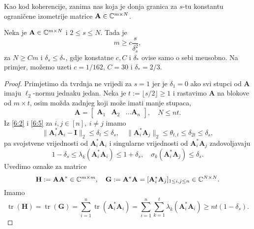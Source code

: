 \documentclass[a4paper,twoside,12pt]{memoir} %
\newcommand{\vect}[1]{\mathbf{#1}}
\renewcommand{\vec}{\vect}
\newcommand{\norm}[1]{\|{#1}\|}
\DeclareMathOperator{\tr}{tr}
\begin{document}
Kao kod koherencije, zanima nas koja je donja granica za $s$-tu konstantu ograni\v{c}ene izometrije matrice $\vec A \in \C^{m \times N}$.

\begin{thm}
    Neka je $\vec A \in \C^{m \times N}$ i $2 \leq s \leq N$. Tada je
    \begin{equation}\label{6:9}
        m \geq c \frac{s}{\delta_s^2} , 
    \end{equation}
    za $N \geq Cm$ i $\delta_s \leq \delta_*$, gdje konstatne $c, C$ i $\delta_*$ ovise samo o sebi me\dj usobno. Na primjer, mo\v{z}emo uzeti $c = 1/162$, $C = 30$ i $\delta_* = 2/3$.
\end{thm}
\begin{proof}
    Primjetimo da tvrdnja ne vrijedi za $s = 1$ jer je $\delta_1 = 0$ ako svi stupci od $\vec A$ imaju $\ell_2$-normu jednaku jedan. Neka je $t := \lfloor s/2 \rfloor \geq 1$ i rastavimo $\vec A$ na blokove od $m \times t$, osim mo\v{z}da zadnjeg koji mo\v{z}e imati manje stupaca,
    \begin{equation*}
        \vec A =
        \begin{bmatrix*}
            \vec A_1 & \vec A_2 & \dots \vec A_n 
        \end{bmatrix*},
        \quad  N \leq nt.
    \end{equation*}
    Iz \eqref{6:2} i \eqref{6:5} za $i,j \in [n],\ i \neq j$ imamo
    \begin{equation*}
        \norm{\vec A^*_i \vec A_i - \vec I}_2 \leq \delta_t \leq \delta_s, \quad \norm{\vec A^*_i \vec A_j}_2 \leq \theta_{t,t} \leq \delta_{2t} \leq \delta_s,
    \end{equation*}
    pa svojstvene vrijednosti od $\vec A^*_i \vec A_i$ i singularne vrijednosti od $\vec A^*_i \vec A_j$ zadovoljavaju
    \begin{equation*}
        1 - \delta_s \leq \lambda_k(\vec A^*_i \vec A_i) \leq 1 + \delta_s, \quad \sigma_k(\vec A^*_i \vec A_j) \leq \delta_s. 
    \end{equation*}
    Uvedimo oznake za matrice
    \begin{equation*}
        \vec H := \vec {AA}^* \in \C^{m \times m}, \quad \vec G := \vec A^* \vec A = [\vec A^*_i \vec A_j]_{1 \leq i,j \leq n} \in \C^{N \times N}. 
    \end{equation*}
    Imamo
    \begin{equation}\label{6:10}
        \tr(\vec H) = \tr(\vec G) = \sum_{i = 1}^{n} \tr(\vec A^*_i \vec A_i) = \sum_{i=1}^n \sum_{k=1}^t \lambda_k(\vec A^*_i \vec A_i) \geq nt(1-\delta_s).

\end{equation}
\end{proof}
\end{document}
